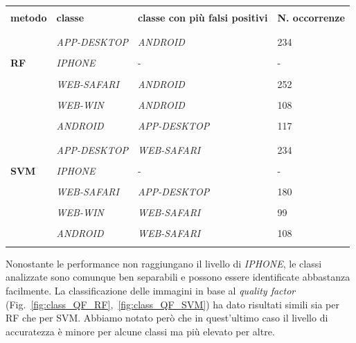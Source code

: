 \begin{center}
    \begin{tabular}{llll}
    \hline
    \\[-1em]
    \textbf{metodo} & \textbf{classe} & \textbf{classe con più falsi positivi} & \textbf{N. occorrenze} \\[-1em]\\
    \hline
    \\[-1em]
    \multirow{5}{4em}{\textbf{RF}} & \textit{APP-DESKTOP} & \textit{ANDROID} & 234 \\[-1em]\\
    & \textit{IPHONE} & - & - \\[-1em]\\
    & \textit{WEB-SAFARI} & \textit{ANDROID} & 252 \\[-1em]\\
    & \textit{WEB-WIN} & \textit{ANDROID} & 108 \\[-1em]\\
    & \textit{ANDROID} & \textit{APP-DESKTOP} & 117 \\[-1em]\\
    \hline
    \\[-1em]
    \multirow{5}{4em}{\textbf{SVM}} & \textit{APP-DESKTOP} & \textit{WEB-SAFARI} & 234 \\[-1em]\\
    & \textit{IPHONE} & - & - \\[-1em]\\
    & \textit{WEB-SAFARI} & \textit{APP-DESKTOP } & 180 \\[-1em]\\
    & \textit{WEB-WIN} & \textit{WEB-SAFARI} & 99 \\[-1em]\\
    & \textit{ANDROID} & \textit{WEB-SAFARI} & 108 \\[-1em]\\
    \hline
    \end{tabular}
\end{center}

Nonostante le performance non raggiungano il livello di \textit{IPHONE}, le classi analizzate sono comunque ben separabili e possono essere identificate abbastanza facilmente. La classificazione delle immagini in base al \textit{quality factor} (Fig.~\ref{fig:class_QF_RF},~\ref{fig:class_QF_SVM}) ha dato risultati simili sia per RF che per SVM. Abbiamo notato però che in quest'ultimo caso il livello di accuratezza è minore per alcune classi ma più elevato per altre.\\

